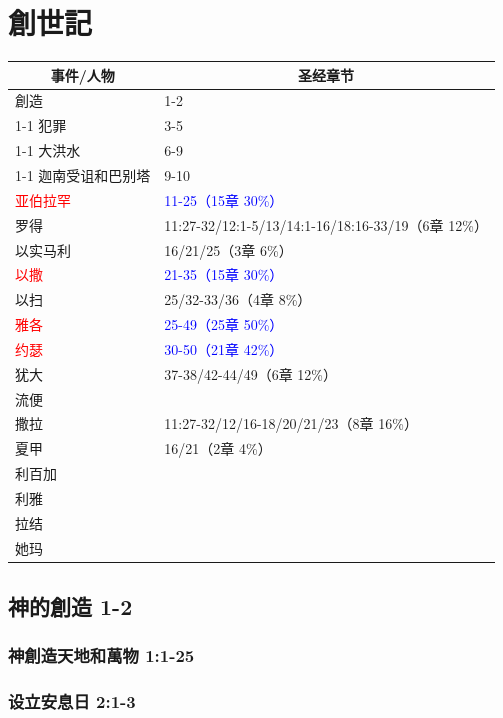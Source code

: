 \chapter{創世記}
\begin{table}[H]
\centering
\begin{tabular}{p{3cm}|p{}}\hline\hline
\multicolumn{1}{c|}{事件/人物}&\multicolumn{1}{c}{圣经章节}\\\hline
創造&1-2\\\cline{1-1}
犯罪&3-5\\\cline{1-1}
大洪水&6-9\\\cline{1-1}
迦南受诅和巴别塔&9-10\\\hline
\textcolor{red}{亚伯拉罕}&\textcolor{blue}{11-25（15章 30\%）}\\\hline
罗得&11:27-32/12:1-5/13/14:1-16/18:16-33/19（6章 12\%）\\\hline
以实马利&16/21/25（3章 6\%）\\\hline
\textcolor{red}{以撒}&\textcolor{blue}{21-35（15章 30\%）}\\\hline
以扫&25/32-33/36（4章 8\%）\\\hline
\textcolor{red}{雅各}&\textcolor{blue}{25-49（25章 50\%）}\\\hline
\textcolor{red}{约瑟}&\textcolor{blue}{30-50（21章 42\%）}\\\hline
犹大&37-38/42-44/49（6章 12\%）\\\hline
流便&\\\hline\hline
撒拉&11:27-32/12/16-18/20/21/23（8章 16\%）\\\hline
夏甲&16/21（2章 4\%）\\\hline
利百加&\\\hline
利雅&\\\hline
拉结&\\\hline
她玛&\\\hline
\end{tabular}
\end{table}


\section{神的創造 1-2}
\subsection{神創造天地和萬物 1:1-25}
\subsection{设立安息日 2:1-3}


